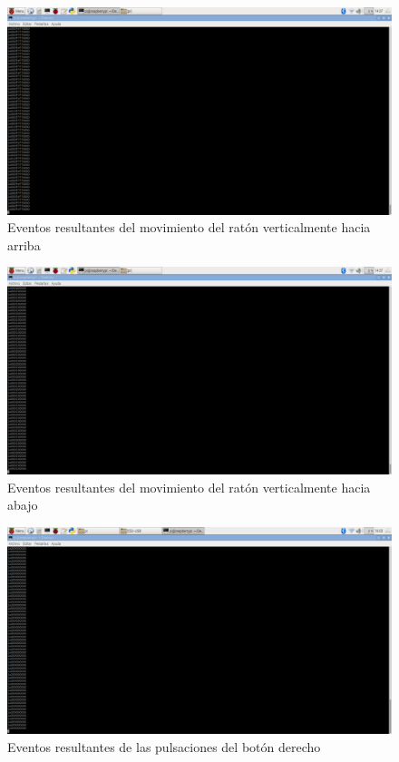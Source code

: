     \begin{figure}[p]
    \centering
    \includegraphics[scale = 0.25]{capitulo_04/figuras_dir/arriba.jpg}
    \caption{Eventos resultantes del movimiento del ratón verticalmente hacia arriba}
    \label{fig: verticalmente hacia arriba}
    \end{figure}

    \begin{figure}[p]
    \centering
    \includegraphics[scale = 0.25]{capitulo_04/figuras_dir/Abajo.jpg}
    \caption{Eventos resultantes del movimiento del ratón verticalmente hacia abajo}
    \label{fig: verticalmente hacia abajo}
    \end{figure}

    \begin{figure}[p]
    \centering
    \includegraphics[scale = 0.25]{capitulo_04/figuras_dir/clickder.jpg}
    \caption{Eventos resultantes de las pulsaciones del botón derecho}
    \label{fig: pulsaciones del botón derecho}
    \end{figure}


